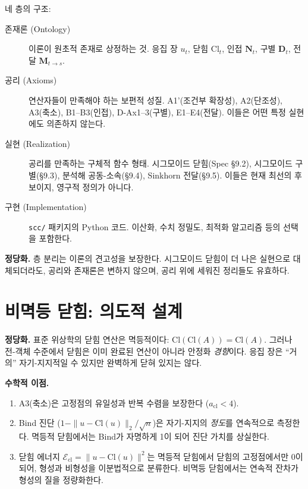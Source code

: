 네 층의 구조:

\begin{description}
    \item[존재론 (Ontology)] 이론이 원초적 존재로 상정하는 것. 응집 장 $u_t$, 닫힘 $\mathrm{Cl}_t$, 인접 $\mathbf{N}_t$, 구별 $\mathbf{D}_t$, 전달 $\mathbf{M}_{t \to s}$.

    \item[공리 (Axioms)] 연산자들이 만족해야 하는 보편적 성질. A1'(조건부 확장성), A2(단조성), A3(축소), B1--B3(인접), D-Ax1--3(구별), E1--E4(전달). 이들은 어떤 특정 실현에도 의존하지 않는다.

    \item[실현 (Realization)] 공리를 만족하는 구체적 함수 형태. 시그모이드 닫힘(Spec \S9.2), 시그모이드 구별(\S9.3), 분석해 공동-소속(\S9.4), Sinkhorn 전달(\S9.5). 이들은 현재 최선의 후보이지, 영구적 정의가 아니다.

    \item[구현 (Implementation)] \texttt{scc/} 패키지의 Python 코드. 이산화, 수치 정밀도, 최적화 알고리즘 등의 선택을 포함한다.
\end{description}

\textbf{정당화.} 층 분리는 이론의 견고성을 보장한다. 시그모이드 닫힘이 더 나은 실현으로 대체되더라도, 공리와 존재론은 변하지 않으며, 공리 위에 세워진 정리들도 유효하다.


\section{비멱등 닫힘: 의도적 설계}
\label{app:cn-nonidempotence}

\begin{center}
\end{center}

\textbf{정당화.} 표준 위상학의 닫힘 연산은 멱등적이다: $\mathrm{Cl}(\mathrm{Cl}(A)) = \mathrm{Cl}(A)$. 그러나 전-객체 수준에서 닫힘은 이미 완료된 연산이 아니라 안정화 \emph{경향}이다. 응집 장은 ``거의'' 자기-지지적일 수 있지만 완벽하게 닫혀 있지는 않다.

\textbf{수학적 이점.}
\begin{enumerate}
    \item A3(축소)은 고정점의 유일성과 반복 수렴을 보장한다 ($a_{\mathrm{cl}} < 4$).
    \item Bind 진단 ($1 - \|u - \mathrm{Cl}(u)\|_2/\sqrt{n}$)은 자기-지지의 \emph{정도}를 연속적으로 측정한다. 멱등적 닫힘에서는 Bind가 자명하게 1이 되어 진단 가치를 상실한다.
    \item 닫힘 에너지 $\mathcal{E}_{\mathrm{cl}} = \|u - \mathrm{Cl}(u)\|^2$는 멱등적 닫힘에서 닫힘의 고정점에서만 0이 되어, 형성과 비형성을 이분법적으로 분류한다. 비멱등 닫힘에서는 연속적 잔차가 형성의 질을 정량화한다.
\end{enumerate}


